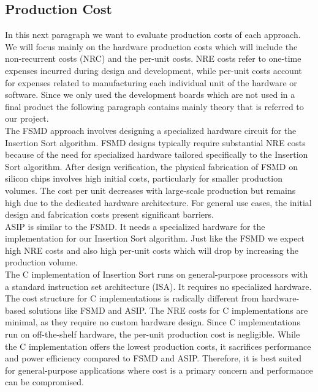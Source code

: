 \documentclass[conference]{IEEEtran}
\begin{document}
\subsection{Production Cost}
In this next paragraph we want to evaluate production costs of each approach. We will focus mainly on the hardware production costs which will include the non-recurrent costs (NRC) and the per-unit costs. NRE costs refer to one-time expenses incurred during design and development, while per-unit costs account for expenses related to manufacturing each individual unit of the hardware or software. Since we only used the development boards which are not used in a final product the following paragraph contains mainly theory that is referred to our project.\\
The FSMD approach involves designing a specialized hardware circuit for the Insertion Sort algorithm. FSMD designs typically require substantial NRE costs because of the need for specialized hardware tailored specifically to the Insertion Sort algorithm. After design verification, the physical fabrication of FSMD on silicon chips involves high initial costs, particularly for smaller production volumes. The cost per unit decreases with large-scale production but remains high due to the dedicated hardware architecture. For general use cases, the initial design and fabrication costs present significant barriers.\\
ASIP is similar to the FSMD. It needs a specialized hardware for the implementation for our Insertion Sort algorithm. Just like the FSMD we expect high NRE costs and also high per-unit costs which will drop by increasing the production volume.\\
The C implementation of Insertion Sort runs on general-purpose processors with a standard instruction set architecture (ISA). It requires no specialized hardware. The cost structure for C implementations is radically different from hardware-based solutions like FSMD and ASIP. The NRE costs for C implementations are minimal, as they require no custom hardware design. Since C implementations run on off-the-shelf hardware, the per-unit production cost is negligible. 
While the C implementation offers the lowest production costs, it sacrifices performance and power efficiency compared to FSMD and ASIP. Therefore, it is best suited for general-purpose applications where cost is a primary concern and performance can be compromised.\\
\end{document}
